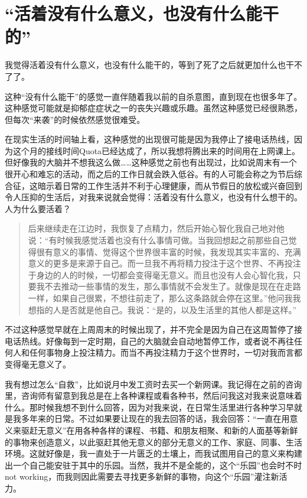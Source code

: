 \chapter{“活着没有什么意义，也没有什么能干的”}



我觉得活着没有什么意义，也没有什么能干的，等到了死了之后就更加什么也干不了了。

这种“没有什么能干”的感觉一直伴随着我以前的自杀意图，直到现在也很多年了。这种感觉可能就是抑郁症症状之一的丧失兴趣或乐趣。虽然这种感觉已经很熟悉，但每次“来袭”的时候依然感觉很难受。

在现实生活的时间轴上看，这种感觉的出现很可能是因为我停止了接电话热线，因为这个月的接线时间Quota已经达成了，所以我想将腾出来的时间用在上网课上。但好像我的大脑并不想我这么做……这种感觉之前也有出现过，比如说周末有一个很开心和难忘的活动，而之后的工作日就会跌入低谷。有的人可能会称之为节后综合征，这暗示着日常的工作生活并不利于心理健康，而从节假日的放松或兴奋回到令人压抑的生活后，对我来说就会觉得：活着没有什么意义，也没有什么想干的。人为什么要活着？

\blockquote{
	后来继续走在江边时，我恢复了点精力，然后开始心智化我自己地对他说：“有时候我感觉活着也没有什么事情可做。当我回想起之前那些自己觉得很有意义的事情、觉得这个世界很丰富的时候，我发现其实丰富的、充满意义的更多是来源于自己。而一旦我不再将精力投注于这个世界、不再投注于身边的人的时候，一切都会变得毫无意义。而且也没有人会心智化我，只要我不去推动一些事情的发生，那么事情就不会发生了。就像是现在在走路一样，如果自己很累，不想往前走了，那么这条路就会停在这里。”他问我我想指的人是否就是他自己。我说：“是的，以及生活里的其他人都是这样。”

}

不过这种感觉早就在上周周末的时候出现了，并不完全是因为自己在这周暂停了接电话热线。好像每到一定时期，自己的大脑就会自动地暂停工作，或者说不再往任何人和任何事物身上投注精力。而当不再投注精力于这个世界时，一切对我而言都变得毫无意义了。

我有想过怎么“自救”，比如说月中发工资时去买一个新网课。我记得在之前的咨询里，咨询师有留意到我总是在上各种课程或看各种书，然后问我这对我来说意味着什么。那时候我想不到什么回答，因为对我来说，在日常生活里进行各种学习早就是我多年来的日常。不过如果要让现在的我去回答的话，我会回答：“一直在用意义来驱赶无意义”\pozhehao{}在用各种各样的课程、书籍、和朋友相聚、和新的人面基等新鲜的事物来创造意义，以此驱赶其他无意义的部分\pozhehao{}无意义的工作、家庭、同事、生活环境。这就好像是，我一直处于一片匮乏的土壤上，而我试图用自己的意义来构建出一个自己能安驻于其中的乐园。当然，我并不是全能的，这个“乐园”也会时不时 not working，而我则因此需要去寻找更多新鲜的事物，向这个“乐园”灌注新活力。

